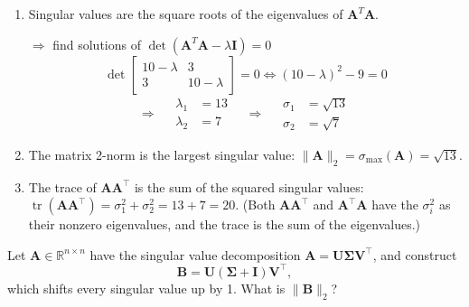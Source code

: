 \begin{solution}
    \begin{enumerate}[label=(\alph*)]
        \item
        Singular values are the square roots of the eigenvalues of $\mathbf{A}^T\mathbf{A}$. 
    
        \(\Rightarrow\) find solutions of $\det(\mathbf{A}^T\mathbf{A} - \lambda\mathbf{I}) = 0$
        \[
        \det\begin{bmatrix} 10-\lambda & 3 \\ 3 & 10-\lambda \end{bmatrix} = 0 \iff (10-\lambda)^2 - 9 = 0
        \]
        \[
            \Rightarrow\quad
            \begin{aligned}
                \lambda_1 &= 13\\
                \lambda_2 &= 7
            \end{aligned}
            \quad\Rightarrow\quad
            \boxed{
                \begin{aligned}
                    \sigma_1 &= \sqrt{13}\\
                    \sigma_2 &= \sqrt{7}
                \end{aligned}
            }
        \]
        \item The matrix 2-norm is the largest singular value: $\|\mathbf{A}\|_2 = \sigma_{\max}(\mathbf{A}) = \sqrt{13}$.
        \item The trace of $\mathbf{A}\mathbf{A}^\top$ is the sum of the squared singular values: $\operatorname{tr}(\mathbf{A}\mathbf{A}^\top) = \sigma_1^2 + \sigma_2^2 = 13 + 7 = 20$. (Both $\mathbf{A}\mathbf{A}^\top$ and $\mathbf{A}^\top\mathbf{A}$ have the $\sigma_i^2$ as their nonzero eigenvalues, and the trace is the sum of the eigenvalues.)
    \end{enumerate}
\end{solution}

\begin{exercise} %
    Let $\mathbf{A} \in \mathbb{R}^{n \times n}$ have the singular value decomposition $\mathbf{A} = \mathbf{U}\boldsymbol{\Sigma}\mathbf{V}^\top$, and construct
    \begin{equation*}
        \mathbf{B} = \mathbf{U}(\boldsymbol{\Sigma} + \mathbf{I})\mathbf{V}^\top,
    \end{equation*}
    which shifts every singular value up by 1. What is $\|\mathbf{B}\|_2$?
\end{exercise}

